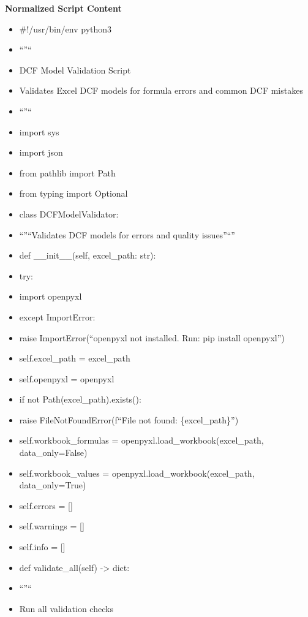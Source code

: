 \documentclass[11pt]{article}
\begin{document}
\textbf{Normalized Script Content}
\begin{itemize}[leftmargin=*,itemsep=2pt,topsep=2pt]
\item {} \#!/usr/bin/env python3
\item {} ``''``
\item {} DCF Model Validation Script
\item {} Validates Excel DCF models for formula errors and common DCF mistakes
\item {} ``''``
\item {} import sys
\item {} import json
\item {} from pathlib import Path
\item {} from typing import Optional
\item {} class DCFModelValidator:
\item {} ``''``Validates DCF models for errors and quality issues''``''
\item {} def \_\allowbreak{}\_\allowbreak{}init\_\allowbreak{}\_\allowbreak{}(self, excel\_\allowbreak{}path: str):
\item {} try:
\item {} import openpyxl
\item {} except ImportError:
\item {} raise ImportError(``openpyxl not installed. Run: pip install openpyxl'')
\item {} self.excel\_\allowbreak{}path = excel\_\allowbreak{}path
\item {} self.openpyxl = openpyxl
\item {} if not Path(excel\_\allowbreak{}path).exists():
\item {} raise FileNotFoundError(f``File not found: \{excel\_\allowbreak{}path\}'')
\item {} self.workbook\_\allowbreak{}formulas = openpyxl.load\_\allowbreak{}workbook(excel\_\allowbreak{}path, data\_\allowbreak{}only=False)
\item {} self.workbook\_\allowbreak{}values = openpyxl.load\_\allowbreak{}workbook(excel\_\allowbreak{}path, data\_\allowbreak{}only=True)
\item {} self.errors = []
\item {} self.warnings = []
\item {} self.info = []
\item {} def validate\_\allowbreak{}all(self) -> dict:
\item {} ``''``
\item {} Run all validation checks

\end{itemize}
\end{document}

